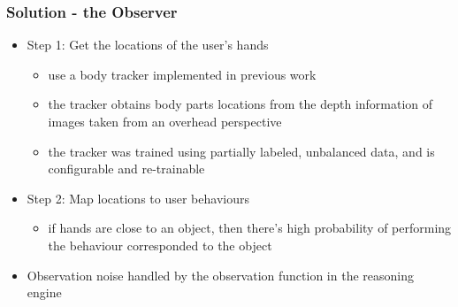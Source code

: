 \documentclass{beamer}
\begin{document}
\begin{frame}
\frametitle{Solution - the Observer}
\begin{itemize}
\item Step 1: Get the locations of the user's hands
\begin{itemize}
\item use a body tracker implemented in previous work
\item the tracker obtains body parts locations from the depth information of images taken from an overhead perspective
\item the tracker was trained using partially labeled, unbalanced data, and is configurable and re-trainable
\end{itemize}
\vspace{.3cm}
\item Step 2: Map locations to user behaviours
\begin{itemize}
\item if hands are close to an object, then there's high probability of performing the behaviour corresponded to the object
\end{itemize}
\vspace{.3cm}
\item Observation noise handled by the observation function in the reasoning engine
\end{itemize}
\end{frame}
\end{document}
